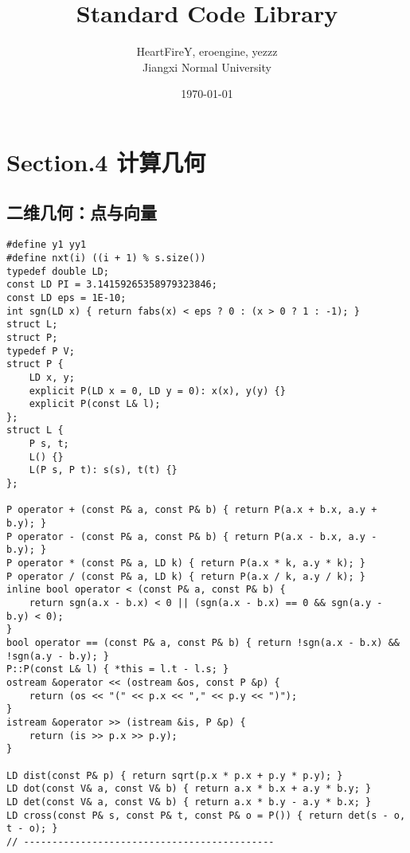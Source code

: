 \documentclass[]{article}
\date{}
\title{\vspace{50mm} \huge Standard Code Library \\[20pt]}
\author{HeartFireY, eroengine, yezzz \\[10pt] Jiangxi Normal University}
\date{\today}
\begin{document}
\begin{titlepage}

\maketitle

\end{titlepage}

\newpage

\renewcommand\labelitemi{$\bullet$}

{
\setcounter{tocdepth}{3}
\tableofcontents
\newpage
}








\hypertarget{section.4-ux8ba1ux7b97ux51e0ux4f55}{%
\section{Section.4 计算几何}\label{section.4-ux8ba1ux7b97ux51e0ux4f55}}

\hypertarget{ux4e8cux7ef4ux51e0ux4f55ux70b9ux4e0eux5411ux91cf}{%
\subsection{二维几何：点与向量}\label{ux4e8cux7ef4ux51e0ux4f55ux70b9ux4e0eux5411ux91cf}}

\begin{verbatim}
#define y1 yy1
#define nxt(i) ((i + 1) % s.size())
typedef double LD;
const LD PI = 3.14159265358979323846;
const LD eps = 1E-10;
int sgn(LD x) { return fabs(x) < eps ? 0 : (x > 0 ? 1 : -1); }
struct L;
struct P;
typedef P V;
struct P {
    LD x, y;
    explicit P(LD x = 0, LD y = 0): x(x), y(y) {}
    explicit P(const L& l);
};
struct L {
    P s, t;
    L() {}
    L(P s, P t): s(s), t(t) {}
};

P operator + (const P& a, const P& b) { return P(a.x + b.x, a.y + b.y); }
P operator - (const P& a, const P& b) { return P(a.x - b.x, a.y - b.y); }
P operator * (const P& a, LD k) { return P(a.x * k, a.y * k); }
P operator / (const P& a, LD k) { return P(a.x / k, a.y / k); }
inline bool operator < (const P& a, const P& b) {
    return sgn(a.x - b.x) < 0 || (sgn(a.x - b.x) == 0 && sgn(a.y - b.y) < 0);
}
bool operator == (const P& a, const P& b) { return !sgn(a.x - b.x) && !sgn(a.y - b.y); }
P::P(const L& l) { *this = l.t - l.s; }
ostream &operator << (ostream &os, const P &p) {
    return (os << "(" << p.x << "," << p.y << ")");
}
istream &operator >> (istream &is, P &p) {
    return (is >> p.x >> p.y);
}

LD dist(const P& p) { return sqrt(p.x * p.x + p.y * p.y); }
LD dot(const V& a, const V& b) { return a.x * b.x + a.y * b.y; }
LD det(const V& a, const V& b) { return a.x * b.y - a.y * b.x; }
LD cross(const P& s, const P& t, const P& o = P()) { return det(s - o, t - o); }
// --------------------------------------------
\end{verbatim}
\end{document}
